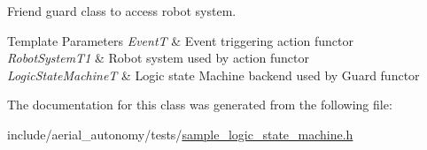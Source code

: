 Friend guard class to access robot system. 


\begin{DoxyTemplParams}{Template Parameters}
{\em Event\-T} & Event triggering action functor \\
\hline
{\em Robot\-System\-T1} & Robot system used by action functor \\
\hline
{\em Logic\-State\-Machine\-T} & Logic state Machine backend used by Guard functor \\
\hline
\end{DoxyTemplParams}


The documentation for this class was generated from the following file\-:\begin{DoxyCompactItemize}
\item 
include/aerial\-\_\-autonomy/tests/\hyperlink{sample__logic__state__machine_8h}{sample\-\_\-logic\-\_\-state\-\_\-machine.\-h}\end{DoxyCompactItemize}
